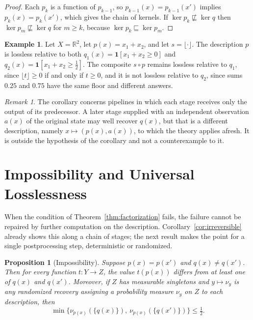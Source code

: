 \documentclass[11pt]{article}
\newtheorem{proposition}[theorem]{Proposition}
\theoremstyle{definition}
\newtheorem{example}[theorem]{Example}
\theoremstyle{remark}
\newtheorem{remark}[theorem]{Remark}
\newcommand{\refines}{\sqsubseteq}
\newcommand{\R}{\mathbb{R}}
\begin{document}
\begin{proof}
Each $p_k$ is a function of $p_{k-1}$, so $p_{k-1}(x)=p_{k-1}(x')$ implies $p_k(x)=p_k(x')$, which gives the chain of kernels. If $\ker p_k\not\refines\ker q$ then $\ker p_m\not\refines\ker q$ for $m\ge k$, because $\ker p_k\refines\ker p_m$.
\end{proof}

\begin{example}
Let $X=\R^2$, let $p(x)=x_1+x_2$, and let $s=\lfloor\cdot\rfloor$. The description $p$ is lossless relative to both $q_1(x)=\mathbf 1[x_1+x_2\ge 0]$ and $q_2(x)=\mathbf 1[x_1+x_2\ge \tfrac12]$. The composite $s\circ p$ remains lossless relative to $q_1$, since $\lfloor t\rfloor\ge0$ if and only if $t\ge0$, and it is not lossless relative to $q_2$, since sums $0.25$ and $0.75$ have the same floor and different answers.
\end{example}

\begin{remark}
The corollary concerns pipelines in which each stage receives only the output of its predecessor. A later stage supplied with an independent observation $a(x)$ of the original state may well recover $q(x)$, but that is a different description, namely $x\mapsto(p(x),a(x))$, to which the theory applies afresh. It is outside the hypothesis of the corollary and not a counterexample to it.
\end{remark}

\section{Impossibility and Universal Losslessness}\label{sec:impossibility}

When the condition of Theorem~\ref{thm:factorization} fails, the failure cannot be repaired by further computation on the description. Corollary~\ref{cor:irreversible} already shows this along a chain of stages; the next result makes the point for a single postprocessing step, deterministic or randomized.

\begin{proposition}[Impossibility]\label{prop:impossibility}
Suppose $p(x)=p(x')$ and $q(x)\ne q(x')$. Then for every function $t:Y\to Z$, the value $t(p(x))$ differs from at least one of $q(x)$ and $q(x')$. Moreover, if $Z$ has measurable singletons and $y\mapsto\nu_y$ is any randomized recovery assigning a probability measure $\nu_y$ on $Z$ to each description, then
\[
\min\{\nu_{p(x)}(\{q(x)\}),\ \nu_{p(x)}(\{q(x')\})\}\le\tfrac12 .
\]
\end{proposition}
\end{document}
